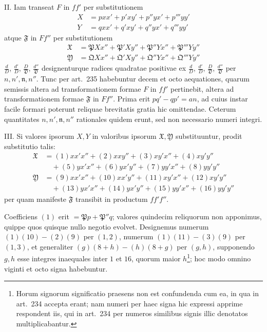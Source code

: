 \documentclass[12pt,a4paper]{article}
\theoremstyle{plain}
\theoremstyle{definition}
\theoremstyle{remark}
\theoremstyle{problemstyle}
\begin{document}
II. Iam transeat $F$ in $ff'$ per substitutionem
\begin{align*}
X &= pxx' + p'xy' + p''yx' + p'''yy' \\
Y &= qxx' + q'xy' + q''yx' + q'''yy'
\end{align*}
atque $\mathfrak{F}$ in $Ff''$ per substitutionem
\begin{align*}
\mathfrak{X} &= \mathfrak{P}Xx'' + \mathfrak{P}'Xy'' + \mathfrak{P}''Yx'' + \mathfrak{P}'''Yy'' \\
\mathfrak{Y} &= \mathfrak{Q}Xx'' + \mathfrak{Q}'Xy'' + \mathfrak{Q}''Yx'' + \mathfrak{Q}'''Yy''
\end{align*}
$\tfrac{d}{D}$, $\tfrac{d'}{D}$, $\tfrac{D}{\mathfrak{D}}$, $\tfrac{d''}{\mathfrak{D}}$ designenturque radices quadratae positivae ex $\tfrac{d}{D}$, $\tfrac{d'}{D}$, $\tfrac{D}{\mathfrak{D}}$, $\tfrac{d''}{\mathfrak{D}}$ per $n, n', \mathfrak{n}, n''$. Tunc per art.\ 235 habebuntur decem et octo aequationes, quarum semissis altera ad transformationem formae $F$ in $ff'$ pertinebit, altera ad transformationem formae $\mathfrak{F}$ in $Ff''$. Prima erit $pq' - qp' = an$, ad cuius instar facile formari poterunt reliquae brevitatis gratia hic omittendae. Ceterum quantitates $n, n', \mathfrak{n}, n''$ rationales quidem erunt, sed non necessario numeri integri.

III. Si valores ipsorum $X, Y$ in valoribus ipsorum $\mathfrak{X}, \mathfrak{Y}$ substituuntur, prodit substitutio talis:
\begin{align*}
\mathfrak{X} &= (1)xx'x'' + (2)xxy'' + (3)xy'x'' + (4)xy'y'' \\
&\quad + (5)yx'x'' + (6)yx'y'' + (7)yy'x'' + (8)yy'y'' \\
\mathfrak{Y} &= (9)xx'x'' + (10)xx'y'' + (11)xy'x'' + (12)xy'y'' \\
&\quad + (13)yx'x'' + (14)yx'y'' + (15)yy'x'' + (16)yy'y''
\end{align*}
per quam manifeste $\mathfrak{F}$ transibit in productum $ff'f''$.

Coefficiens $(1)$ erit $= \mathfrak{P}p + \mathfrak{P}''q$; valores quindecim reliquorum non apponimus, quippe quos quisque nullo negotio evolvet. Designemus numerum $(1)(10) - (2)(9)$ per $(1,2)$, numerum $(1)(11) - (3)(9)$ per $(1,3)$, et generaliter $(g)(8+h) - (h)(8+g)$ per $(g,h)$, supponendo $g, h$ esse integres inaequales inter $1$ et $16$, quorum maior $h$\footnote{Horum signorum significatio praesens non est confundenda cum ea, in qua in art.\ 234 accepta erant; nam numeri per haec signa hic expressi apprime respondent iis, qui in art.\ 234 per numeros similibus signis illic denotatos multiplicabantur.}; hoc modo omnino viginti et octo signa habebuntur.
\end{document}
